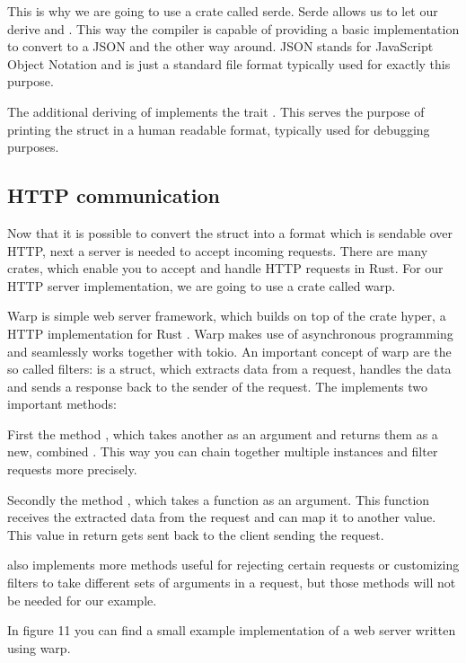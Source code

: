 This is why we are going to use a crate called serde. Serde allows us to let our  derive 
and . This way the compiler is capable of providing a basic implementation to convert  to
a JSON  and the other way around. JSON stands for JavaScript Object Notation and is just a standard file
format typically used for exactly this purpose.

The additional deriving of  implements the trait . This serves the purpose of
printing the struct in a human readable format, typically used for debugging purposes.

\subsection{HTTP communication}
Now that it is possible to convert the struct into a format which is sendable over HTTP, next a server is needed to
accept incoming requests. There are many crates, which enable you to accept and handle HTTP requests in Rust. For our
HTTP server implementation, we are going to use a crate called warp.

Warp is simple web server framework, which builds on top of the crate hyper, a HTTP implementation for Rust
\cite{warp-doc}. Warp makes use of asynchronous programming and seamlessly works together with tokio. An important
concept of warp are the so called filters:  is a struct, which extracts data from a request, handles
the data and sends a response back to the sender of the request. The  implements two important methods:

First the method , which takes another  as an argument and returns
them as a new, combined . This way you can chain together multiple  instances and filter
requests more precisely.

Secondly the method , which takes a function as an argument. This function receives the extracted data from
the request and can map it to another value. This value in return gets sent back to the client sending the request.

 also implements more methods useful for rejecting certain requests or customizing filters to take
different sets of arguments in a request, but those methods will not be needed for our example.

In figure 11 you can find a small example implementation of a web server written using warp.

